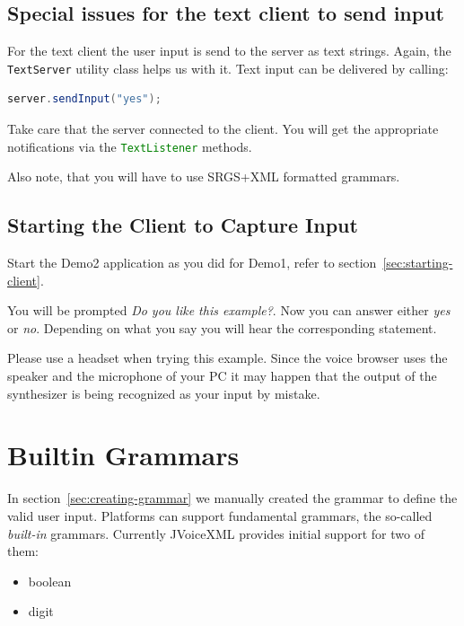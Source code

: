 \documentclass[11pt,a4paper]{book}
\begin{document}
\subsection{Special issues for the text client to send input}

For the text client the user input is send to the server as text strings. Again,
the \lstinline[language=Java]{TextServer} utility class helps us with it.
Text input can be delivered by calling:

\begin{lstlisting}[language=Java]
    server.sendInput("yes");
\end{lstlisting}

Take care that the server connected to the client. You will get the
appropriate notifications via the \lstinline[language=java]{TextListener}
methods.

Also note, that you will have to use SRGS+XML formatted grammars.

\subsection{Starting the Client to Capture Input}
\label{sec:starting-the-client}

Start the Demo2 application as you did for Demo1, refer to
section~\ref{sec:starting-client}.

You will be prompted \emph{Do you like this example?}. Now you can answer
either \emph{yes} or \emph{no}. Depending on what you say you will hear the
corresponding statement.

Please use a headset when trying this example. Since the voice browser uses the
speaker and the microphone of your PC it may happen that the output of the
synthesizer is being recognized as your input by mistake.

\section{Builtin Grammars}

In section~\ref{sec:creating-grammar} we manually created the grammar to
define the valid user input. Platforms can support fundamental grammars, the
so-called \emph{built-in} grammars. Currently JVoiceXML provides initial support
for two of them:
\begin{itemize}
  \item boolean
  \item digit
\end{itemize}
\end{document}
